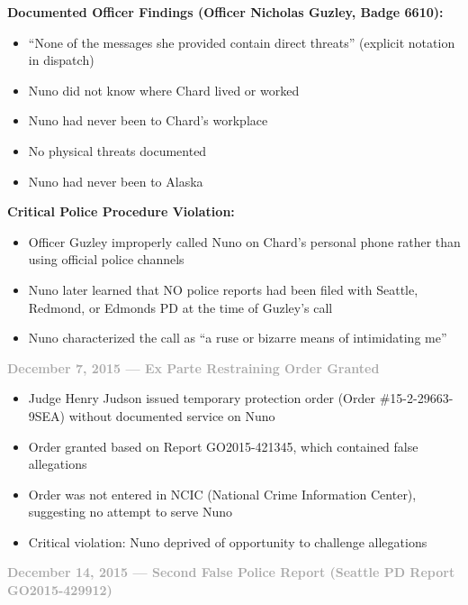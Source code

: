 \documentclass[11pt, letterpaper]{article}
\newcommand{\subsubsectiontitle}[1]{\vspace{0.1in}\noindent\textcolor{DarkGray}{\textbf{#1}}\vspace{0.05in}}
\begin{document}
\textbf{Documented Officer Findings (Officer Nicholas Guzley, Badge 6610):}
\begin{itemize}[leftmargin=*,itemsep=2pt]
    \item ``None of the messages she provided contain direct threats'' (explicit notation in dispatch)
    \item Nuno did not know where Chard lived or worked
    \item Nuno had never been to Chard's workplace
    \item No physical threats documented
    \item Nuno had never been to Alaska
\end{itemize}

\textbf{Critical Police Procedure Violation:}
\begin{itemize}[leftmargin=*,itemsep=2pt]
    \item Officer Guzley improperly called Nuno on Chard's personal phone rather than using official police channels
    \item Nuno later learned that NO police reports had been filed with Seattle, Redmond, or Edmonds PD at the time of Guzley's call
    \item Nuno characterized the call as ``a ruse or bizarre means of intimidating me''
\end{itemize}

\subsubsectiontitle{December 7, 2015 --- Ex Parte Restraining Order Granted}
\begin{itemize}[leftmargin=*,itemsep=2pt]
    \item Judge Henry Judson issued temporary protection order (Order \#15-2-29663-9SEA) without documented service on Nuno
    \item Order granted based on Report GO2015-421345, which contained false allegations
    \item Order was not entered in NCIC (National Crime Information Center), suggesting no attempt to serve Nuno
    \item Critical violation: Nuno deprived of opportunity to challenge allegations
\end{itemize}

\subsubsectiontitle{December 14, 2015 --- Second False Police Report (Seattle PD Report GO2015-429912)}
\end{document}
